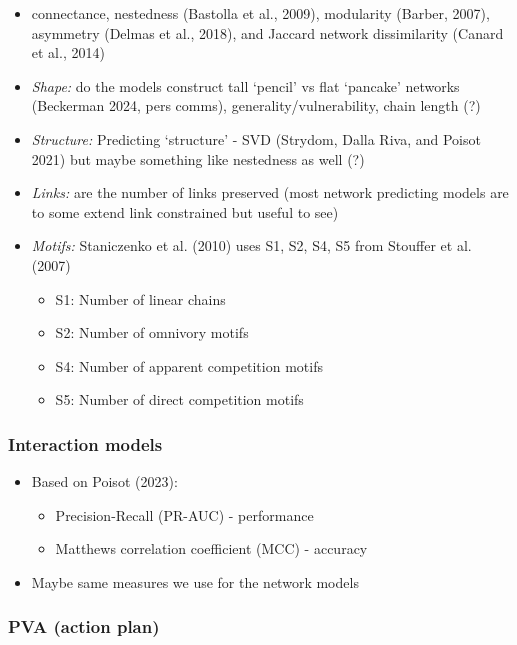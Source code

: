 \documentclass[
  letterpaper,
  DIV=11,
  numbers=noendperiod]{scrartcl}
\providecommand{\tightlist}{%
  \setlength{\itemsep}{0pt}\setlength{\parskip}{0pt}}\usepackage{longtable,booktabs,array}
\begin{document}
\begin{itemize}
\item
  connectance, nestedness (Bastolla et al., 2009), modularity (Barber,
  2007), asymmetry (Delmas et al., 2018), and Jaccard network
  dissimilarity (Canard et al., 2014)
\item
  \emph{Shape:} do the models construct tall `pencil' vs flat `pancake'
  networks (Beckerman 2024, pers comms), generality/vulnerability, chain
  length (?)
\item
  \emph{Structure:} Predicting `structure' - SVD (Strydom, Dalla Riva,
  and Poisot 2021) but maybe something like nestedness as well (?)
\item
  \emph{Links:} are the number of links preserved (most network
  predicting models are to some extend link constrained but useful to
  see)
\item
  \emph{Motifs:} Staniczenko et al. (2010) uses S1, S2, S4, S5 from
  Stouffer et al. (2007)

  \begin{itemize}
  \item
    S1: Number of linear chains
  \item
    S2: Number of omnivory motifs
  \item
    S4: Number of apparent competition motifs
  \item
    S5: Number of direct competition motifs
  \end{itemize}
\end{itemize}

\subsubsection{Interaction models}\label{interaction-models}

\begin{itemize}
\tightlist
\item
  Based on Poisot (2023):

  \begin{itemize}
  \tightlist
  \item
    Precision-Recall (PR-AUC) - performance
  \item
    Matthews correlation coefficient (MCC) - accuracy
  \end{itemize}
\item
  Maybe same measures we use for the network models
\end{itemize}

\subsubsection{PVA (action plan)}\label{pva-action-plan}
\end{document}
